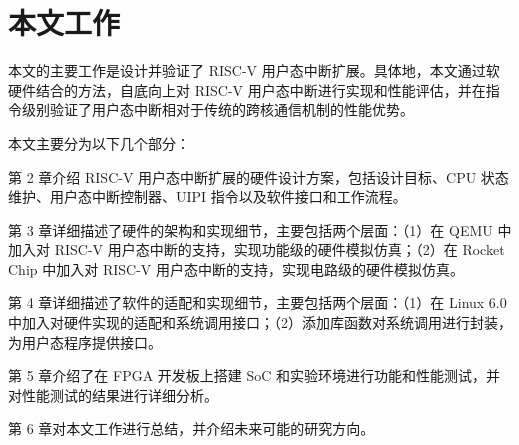 \section{本文工作}

本文的主要工作是设计并验证了 RISC-V 用户态中断扩展。具体地，本文通过软硬件结合的方法，自底向上对 RISC-V 用户态中断进行实现和性能评估，并在指令级别验证了用户态中断相对于传统的跨核通信机制的性能优势。

本文主要分为以下几个部分：

第 2 章介绍 RISC-V 用户态中断扩展的硬件设计方案，包括设计目标、CPU 状态维护、用户态中断控制器、UIPI 指令以及软件接口和工作流程。

第 3 章详细描述了硬件的架构和实现细节，主要包括两个层面：（1）在 QEMU 中加入对 RISC-V 用户态中断的支持，实现功能级的硬件模拟仿真；（2）在 Rocket Chip 中加入对 RISC-V 用户态中断的支持，实现电路级的硬件模拟仿真。

第 4 章详细描述了软件的适配和实现细节，主要包括两个层面：（1）在 Linux 6.0 中加入对硬件实现的适配和系统调用接口；（2）添加库函数对系统调用进行封装，为用户态程序提供接口。

第 5 章介绍了在 FPGA 开发板上搭建 SoC 和实验环境进行功能和性能测试，并对性能测试的结果进行详细分析。

第 6 章对本文工作进行总结，并介绍未来可能的研究方向。